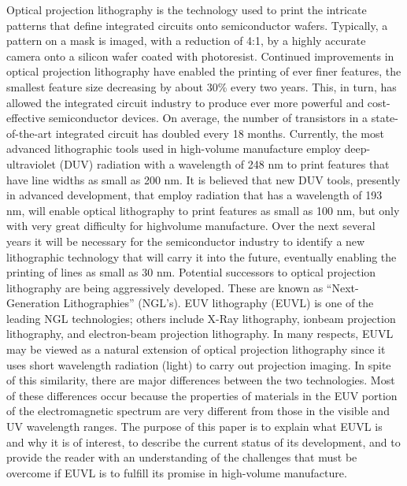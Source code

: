\documentclass[12pt,a4paper]{report}
\begin{document}
Optical projection lithography is the technology used to
print the intricate patterns that define integrated circuits
onto semiconductor wafers. Typically, a pattern on a
mask is imaged, with a reduction of 4:1, by a highly
accurate camera onto a silicon wafer coated with
photoresist. Continued improvements in optical
projection lithography have enabled the printing of ever
finer features, the smallest feature size decreasing by
about 30\% every two years. This, in turn, has allowed
the integrated circuit industry to produce ever more
powerful and cost-effective semiconductor devices. On
average, the number of transistors in a state-of-the-art
integrated circuit has doubled every 18 months.
Currently, the most advanced lithographic tools used in
high-volume manufacture employ deep-ultraviolet (DUV)
radiation with a wavelength of 248 nm to print features
that have line widths as small as 200 nm. It is believed
that new DUV tools, presently in advanced development,
that employ radiation that has a wavelength of 193 nm,
will enable optical lithography to print features as small
as 100 nm, but only with very great difficulty for highvolume manufacture. Over the next several years it will
be necessary for the semiconductor industry to identify a
new lithographic technology that will carry it into the
future, eventually enabling the printing of lines as small
as 30 nm. Potential successors to optical projection
lithography are being aggressively developed. These are
known as “Next-Generation Lithographies” (NGL's).
EUV lithography (EUVL) is one of the leading NGL
technologies; others include X-Ray lithography, ionbeam projection lithography, and electron-beam
projection lithography.
In many respects, EUVL may be viewed as a natural
extension of optical projection lithography since it uses
short wavelength radiation (light) to carry out projection
imaging. In spite of this similarity, there are major
differences between the two technologies. Most of these
differences occur because the properties of materials in
the EUV portion of the electromagnetic spectrum are
very different from those in the visible and UV
wavelength ranges. The purpose of this paper is to
explain what EUVL is and why it is of interest, to
describe the current status of its development, and to
provide the reader with an understanding of the
challenges that must be overcome if EUVL is to fulfill its
promise in high-volume manufacture.
\end{document}
